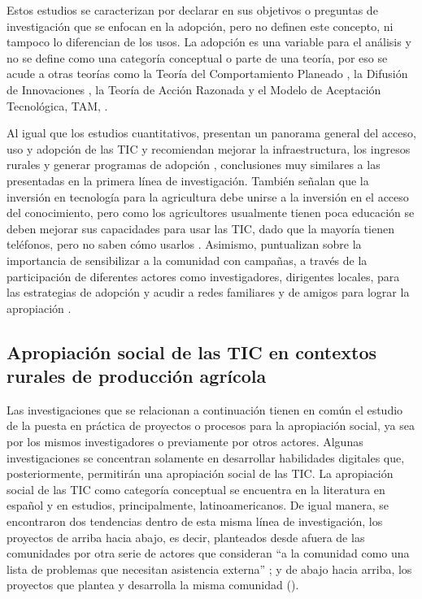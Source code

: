 \documentclass[spanish]{textolivre}
\begin{document}
Estos estudios se caracterizan por declarar en sus objetivos o preguntas de investigación que se enfocan en la adopción, pero no definen este concepto, ni tampoco lo diferencian de los usos. La adopción es una variable para el análisis y no se define como una categoría conceptual o parte de una teoría, por eso se acude a otras teorías como la Teoría del Comportamiento Planeado \cite{alavion_rural_2020}, la Difusión de Innovaciones \cite{shaibu_digital_2018}, la Teoría de Acción Razonada \cite{sikundla_socioeconomic_2018} y el Modelo de Aceptación Tecnológica, TAM, \cite{zaremohzzabieh_information_2016}.

Al igual que los estudios cuantitativos, presentan un panorama general del acceso, uso y adopción de las TIC y recomiendan mejorar la infraestructura, los ingresos rurales y generar programas de adopción \cite{zhu_ict_2020}, conclusiones muy similares a las presentadas en la primera línea de investigación. También señalan que la inversión en tecnología para la agricultura debe unirse a la inversión en el acceso del conocimiento, pero como los agricultores usualmente tienen poca educación se deben mejorar sus capacidades para usar las TIC, dado que la mayoría tienen teléfonos, pero no saben cómo usarlos \cite{owusu_smallholder_2017}. Asimismo, puntualizan sobre la importancia de sensibilizar a la comunidad con campañas, a través de la participación de diferentes actores como investigadores, dirigentes locales, para las estrategias de adopción \cite[p.~15]{mwalupaso_towards_2019} y acudir a redes familiares y de amigos para lograr la apropiación \cite{mariscal_aviles_informational_2016}.

\subsection{Apropiación social de las TIC en contextos rurales de producción agrícola}

Las investigaciones que se relacionan a continuación tienen en común el estudio de la puesta en práctica de proyectos o procesos para la apropiación social, ya sea por los mismos investigadores o previamente por otros actores. Algunas investigaciones se concentran solamente en desarrollar habilidades digitales que, posteriormente, permitirán una apropiación social de las TIC. La apropiación social de las TIC como categoría conceptual se encuentra en la literatura en español y en estudios, principalmente, latinoamericanos. De igual manera, se encontraron dos tendencias dentro de esta misma línea de investigación, los proyectos de arriba hacia abajo, es decir, planteados desde afuera de las comunidades por otra serie de actores que consideran “a la comunidad como una lista de problemas que necesitan asistencia externa” \cite{ye_citizen-led_2021}; y de abajo hacia arriba, los proyectos que plantea y desarrolla la misma comunidad (). 
\end{document}
